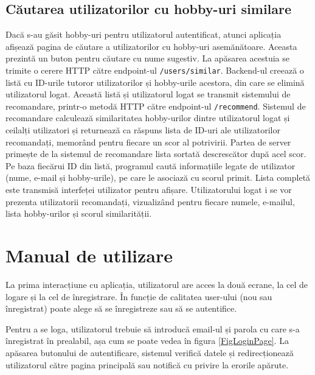 \subsection{Căutarea utilizatorilor cu hobby-uri similare}
\label{subsec:ch4sec2sub4}
Dacă s-au găsit hobby-uri pentru utilizatorul autentificat, atunci aplicația afișează pagina de căutare a utilizatorilor cu hobby-uri asemănătoare.
Aceasta prezintă un buton pentru căutare cu nume sugestiv. 
La apăsarea acestuia se trimite o cerere HTTP către endpoint-ul \texttt{/users/similar}.
Backend-ul creează o listă cu ID-urile tutoror utilizatorilor și hobby-urile acestora, din care se elimină utilizatorul logat.
Această listă și utilizatorul logat se transmit sistemului de recomandare, printr-o metodă HTTP către endpoint-ul \texttt{/recommend}.
Sistemul de recomandare calculează similaritatea hobby-urilor dintre utilizatorul logat și ceilalți utilizatori și returnează ca răspuns lista de ID-uri ale utilizatorilor recomandați, memorând pentru fiecare un scor al potrivirii.
Partea de server primește de la sistemul de recomandare lista sortată descrescător după acel scor. 
Pe baza fiecărui ID din listă, programul caută informațiile legate de utilizator (nume, e-mail și hobby-urile), pe care le asociază cu scorul primit.
Lista completă este transmisă interfeței utilizator pentru afișare.
Utilizatorului logat i se vor prezenta utilizatorii recomandați, vizualizând pentru fiecare numele, e-mailul, lista hobby-urilor și scorul similarității.


\section{Manual de utilizare}
\label{sec:ch4sec3}

La prima interacțiune cu aplicația, utilizatorul are acces la două ecrane, la cel de logare și la cel de înregistrare. 
În funcție de calitatea user-ului (nou sau înregistrat) poate alege să se înregistreze sau să se autentifice.
\par
Pentru a se loga, utilizatorul trebuie să introducă email-ul și parola cu care s-a înregistrat în prealabil, așa cum se poate vedea în figura \ref{FigLoginPage}. 
La apăsarea butonului de autentificare, sistemul verifică datele și redirecționează utilizatorul către pagina principală sau notifică cu privire la erorile apărute. 

